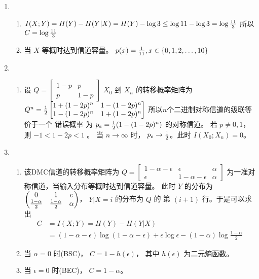 \documentclass{article}
\begin{document}
\begin{enumerate}
\item
\begin{enumerate}[label=(\alph*)] 
\item $I(X;Y) = H(Y) - H(Y|X) = H(Y) - \log 3 \leq \log 11 - \log 3 = \log { 11 \over 3 } $
所以 $ C = \log { 11 \over 3} $
\item 当 $X$ 等概时达到信道容量。 $ p(x) = { 1 \over 11} , x \in \{ 0, 1, 2, \dots, 10 \}$
\end{enumerate}

\item
\begin{enumerate}[label=(\alph*)] 
\item 设 $Q = \begin{bmatrix} 1- p & p \\ p & 1-p \end{bmatrix}$
$X_0$ 到 $X_n$ 的转移概率矩阵为 $Q^n  = { 1 \over 2}
\begin{bmatrix} 1+ (1 -2 p)^n & 1 - (1 - 2p)^n \\
1 - (1 - 2p)^n & 1 + (1 - 2p)^n 
\end{bmatrix} $
所以$n$个二进制对称信道的级联等价于一个 错误概率 为 $ p_e =  { 1 \over 2} (1 - (1 - 2p)^n ) $ 的对称信道。
若 $ p \neq 0, 1 $， 则 $ -1 < 1 - 2 p < 1 $ 。 当 $ n \to \infty $ 时， $ p_e \to { 1 \over 2} $。此时 $ I (X_0;X_n ) = 0 $。 
\end{enumerate}
\item
\begin{enumerate}[label=(\alph*)] 
\item 
该DMC信道的转移概率矩阵为 $ Q = \begin{bmatrix} 1 - \alpha - \epsilon & \epsilon & \alpha \\
\epsilon & 1 - \alpha - \epsilon & \alpha 
\end{bmatrix}$
为一准对称信道，当输入分布等概时达到信道容量。
此时 $ Y $ 的分布为 $ \begin{pmatrix} 0 & 1 & e \\ { 1 - \alpha \over 2} & { 1 - \alpha \over 2} & \alpha \end{pmatrix} $，
$ Y | X = i $ 的分布为 $Q$ 的 第 $ ( i + 1 ) $ 行。于是可以求出
\begin{align*}
 C & = I (X;Y) = H(Y) - H(Y|X) \\
 & = (1 - \alpha - \epsilon ) \log ( 1 - \alpha - \epsilon ) + \epsilon \log \epsilon - (1 - \alpha ) \log \frac{ 1 - \alpha }{ 2}
\end{align*}
\item 当 $ \alpha = 0 $ 时(BSC)， $ C = 1 - h(\epsilon)$， 其中 $ h(\epsilon) $ 为二元熵函数。
\item 当 $ \epsilon = 0 $ 时(BEC)， $ C = 1 - \alpha $。
\end{enumerate}


\end{enumerate}
\end{document}
